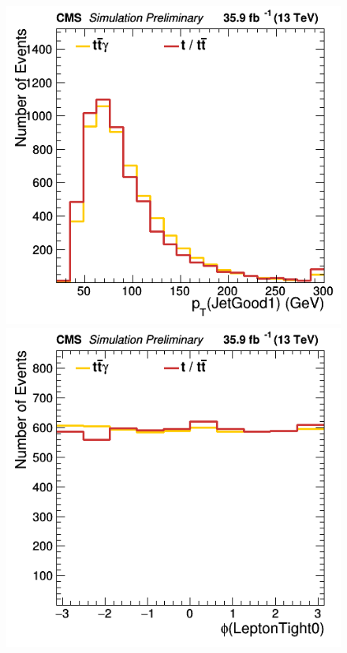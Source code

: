 \documentclass[11pt]{scrartcl}
\begin{document}
	\begin{figure}[H]
	\centering
	\begin{minipage}{.5\textwidth}
	  \centering
	  \includegraphics[width=0.7\linewidth]{figures/Notused/JetGood1_pt.png}
	\end{minipage}%
	\begin{minipage}{.5\textwidth}
	  \centering
	  \includegraphics[width=0.7\linewidth]{figures/Notused/LeptonTight0__phi.png}
	\end{minipage}
	\end{figure}
	
\end{document}
